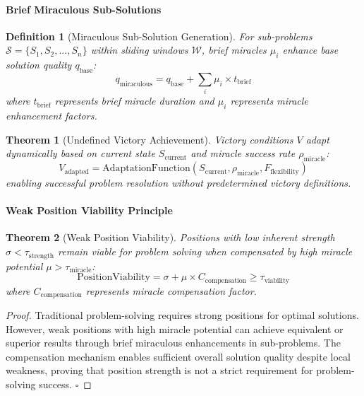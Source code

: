 \documentclass[12pt,a4paper]{article}
\newtheorem{theorem}{Theorem}
\newtheorem{definition}{Definition}
\begin{document}
\paragraph{Brief Miraculous Sub-Solutions}

\begin{definition}[Miraculous Sub-Solution Generation]
For sub-problems $\mathcal{S} = \{S_1, S_2, ..., S_n\}$ within sliding windows $\mathcal{W}$, brief miracles $\mu_i$ enhance base solution quality $q_{\text{base}}$:
\begin{equation}
q_{\text{miraculous}} = q_{\text{base}} + \sum_{i} \mu_i \times t_{\text{brief}}
\end{equation}
where $t_{\text{brief}}$ represents brief miracle duration and $\mu_i$ represents miracle enhancement factors.
\end{definition}

\begin{theorem}[Undefined Victory Achievement]
Victory conditions $V$ adapt dynamically based on current state $S_{\text{current}}$ and miracle success rate $\rho_{\text{miracle}}$:
\begin{equation}
V_{\text{adapted}} = \text{AdaptationFunction}(S_{\text{current}}, \rho_{\text{miracle}}, F_{\text{flexibility}})
\end{equation}
enabling successful problem resolution without predetermined victory definitions.
\end{theorem}

\paragraph{Weak Position Viability Principle}

\begin{theorem}[Weak Position Viability]
Positions with low inherent strength $\sigma < \tau_{\text{strength}}$ remain viable for problem solving when compensated by high miracle potential $\mu > \tau_{\text{miracle}}$:
\begin{equation}
\text{PositionViability} = \sigma + \mu \times C_{\text{compensation}} \geq \tau_{\text{viability}}
\end{equation}
where $C_{\text{compensation}}$ represents miracle compensation factor.
\end{theorem}

\begin{proof}
Traditional problem-solving requires strong positions for optimal solutions. However, weak positions with high miracle potential can achieve equivalent or superior results through brief miraculous enhancements in sub-problems. The compensation mechanism enables sufficient overall solution quality despite local weakness, proving that position strength is not a strict requirement for problem-solving success. $\square$
\end{proof}
\end{document}
